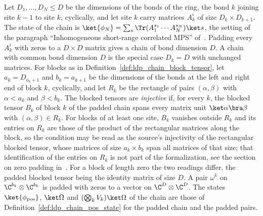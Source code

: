 \begin{definition}
    \label{def:ldp_varying_bond_chain}
    \leanok
    Let $D_1,\dots,D_N\le D$ be the dimensions of the bonds of the ring, the bond
    $k$ joining site $k-1$ to site $k$, cyclically, and let site $k$ carry
    matrices $A_k^i$ of size $D_k\times D_{k+1}$. The state of the chain is
    $\ket{\phi_N}=\sum_s\Tr(A_1^{s_1}\cdots A_N^{s_N})\ket s$, the setting of
    the paragraph ``Inhomogeneous short-range correlated MPS''
    of~\cite{Malz2024Preparation}. Padding every $A_k^i$ with zeros to a
    $D\times D$ matrix gives a chain of bond dimension $D$. A chain with
    common bond dimension $D$ is the special case $D_k=D$ with unchanged
    matrices. For blocks as in
    Definition~\ref{def:ldp_chain_block_tensor}, let $a_k=D_{o_k+1}$ and
    $b_k=a_{k+1}$ be the dimensions of the bonds at the left and right end of
    block $k$, cyclically, and let $R_k$ be the rectangle of pairs
    $(\alpha,\beta)$ with $\alpha<a_k$ and $\beta<b_k$. The blocked tensors are
    \emph{injective} if, for every $k$, the blocked tensor $B_k$ of block $k$ of
    the padded chain spans every matrix unit $\ket\alpha\bra\beta$ with
    $(\alpha,\beta)\in R_k$. For blocks of at least one site, $B_k$ vanishes
    outside $R_k$ and its entries on $R_k$ are those of the product of the
    rectangular matrices along the block, so the condition may be read as the
    source's injectivity of the rectangular blocked tensor, whose matrices of
    size $a_k\times b_k$ span all matrices of that size; that identification of
    the entries on $R_k$ is not part of the formalization, see the section on
    zero padding in~\cite{gap:mswc24_inhomogeneous_scope}. For a block of
    length zero the two readings differ, the padded blocked tensor being the
    identity matrix of size $D$. A pair $\omega^k$ on
    $\C^{b_k}\otimes\C^{b_k}$ is padded with zeros to a vector on
    $\C^D\otimes\C^D$. The states $\ket{\phi_{\mathrm{pos}}}$, $\ket\Omega$ and
    $(\bigotimes_kV_k)\ket\Omega$ of the chain are those of
    Definition~\ref{def:ldp_chain_pos_state} for the padded chain and the
    padded pairs.
\end{definition}

